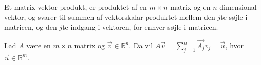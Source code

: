 Et matrix-vektor produkt, er produktet af en $m\times n$ matrix og en $n$ dimensional vektor, og svarer til summen af vektorskalar-produktet mellem den $j$te søjle i matricen, og den $j$te indgang i vektoren, for enhver søjle i matricen.
\begin{defn}
Lad $A$ være en $m\times n$ matrix og $\vec{v}\in \mathds{R}^n$. 
Da vil $A \vec{v} = \sum_{j=1}^n \vec{A_j}v_j = \vec{u}$, hvor $\vec{u} \in \mathds{R}^m$.
\label{def:matrixvektorprodukt}
\end{defn}
